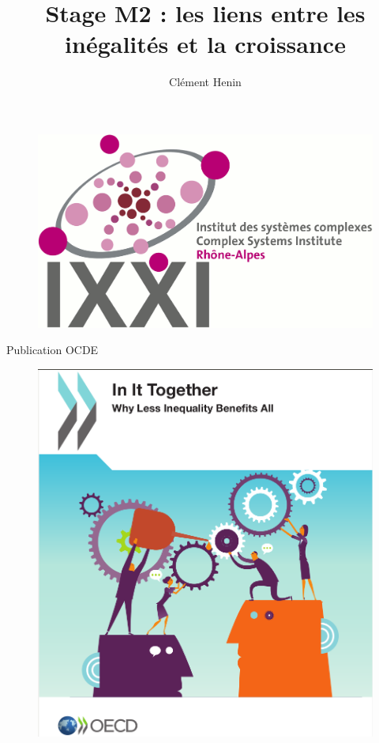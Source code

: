 \documentclass[xcolor=x11names,french]{beamer}
\renewcommand{\(}{\begin{columns}}
\renewcommand{\)}{\end{columns}}
\newcommand{\<}[1]{\begin{column}{#1}}
\renewcommand{\>}{\end{column}}
\begin{document}
\begin{frame}[plain]
\title{Stage M2 : les liens entre les inégalités et la croissance}
\author{
	Clément Henin
}
\titlepage

\begin{figure}
\includegraphics[scale=0.1]{logoixxi.pdf}
\end{figure}

\end{frame}


\begin{frame}{Publication OCDE}

\begin{figure}
\includegraphics[scale=0.2]{cover_OECD}
\end{figure}


\end{frame}
\end{document}
